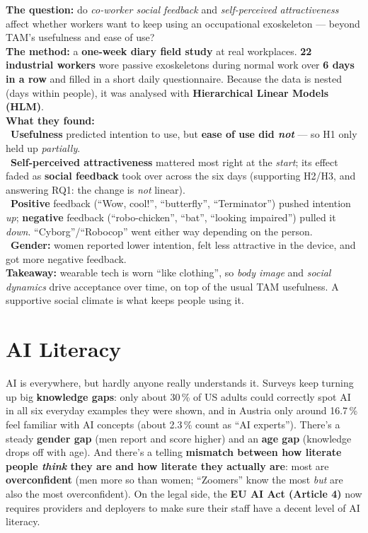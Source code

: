 \documentclass[11pt, oneside]{book}
\begin{document}
\begin{thmbox}[title={Paper 1 — what you need to remember}]
\textbf{The question:} do \emph{co-worker social feedback} and
\emph{self-perceived attractiveness} affect whether workers want to keep using
an occupational exoskeleton — beyond TAM's usefulness and ease of use?\\
\textbf{The method:} a \textbf{one-week diary field study} at real workplaces.
\textbf{22 industrial workers} wore passive exoskeletons during normal work
over \textbf{6 days in a row} and filled in a short daily questionnaire.
Because the data is nested (days within people), it was analysed with
\textbf{Hierarchical Linear Models (HLM)}.\\
\textbf{What they found:}\\
\textbullet\ \textbf{Usefulness} predicted intention to use, but \textbf{ease
of use did \emph{not}} — so H1 only held up \emph{partially}.\\
\textbullet\ \textbf{Self-perceived attractiveness} mattered most right at the
\emph{start}; its effect faded as \textbf{social feedback} took over across the
six days (supporting H2/H3, and answering RQ1: the change is \emph{not}
linear).\\
\textbullet\ \textbf{Positive} feedback (``Wow, cool!'', ``butterfly'',
``Terminator'') pushed intention \emph{up}; \textbf{negative} feedback
(``robo-chicken'', ``bat'', ``looking impaired'') pulled it \emph{down}.
``Cyborg''/``Robocop'' went either way depending on the person.\\
\textbullet\ \textbf{Gender:} women reported lower intention, felt less
attractive in the device, and got more negative feedback.\\
\textbf{Takeaway:} wearable tech is worn ``like clothing'', so \emph{body
image} and \emph{social dynamics} drive acceptance over time, on top of the
usual TAM usefulness. A supportive social climate is what keeps people using
it.
\end{thmbox}


\chapter{AI Literacy}

AI is everywhere, but hardly anyone really understands it. Surveys keep
turning up big \textbf{knowledge gaps}: only about 30\,\% of US adults could
correctly spot AI in all six everyday examples they were shown, and in Austria
only around 16.7\,\% feel familiar with AI concepts (about 2.3\,\% count as
``AI experts''). There's a steady \textbf{gender gap} (men report and score
higher) and an \textbf{age gap} (knowledge drops off with age). And there's a
telling \textbf{mismatch between how literate people \emph{think} they are and
how literate they actually are}: most are \textbf{overconfident} (men more so
than women; ``Zoomers'' know the most \emph{but} are also the most
overconfident). On the legal side, the \textbf{EU AI Act (Article 4)} now
requires providers and deployers to make sure their staff have a decent level
of AI literacy.
\end{document}
